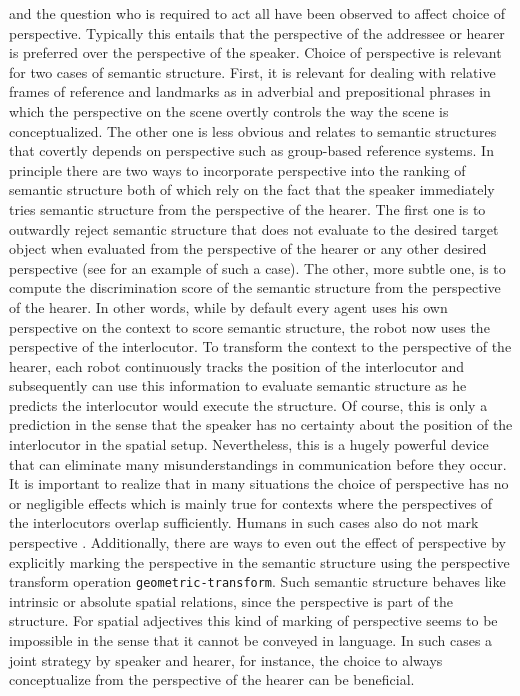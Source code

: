 \begin{description}
and the question who is required to act \citep{tversky2009perspective}
all have been observed to affect choice of perspective. Typically this
entails that the perspective of the addressee or hearer is preferred over
the perspective of the speaker. Choice of perspective is relevant for 
two cases of semantic structure. First, it is relevant for  
dealing with relative frames of reference and landmarks as in adverbial
and prepositional phrases in which the perspective on the scene 
overtly controls the way the scene is conceptualized. 
The other one is less obvious and relates to semantic structures that 
covertly depends on perspective such as 
group-based reference systems. In principle there are two ways 
to incorporate perspective into the ranking of semantic structure both of 
which rely on the fact that the speaker immediately tries semantic
structure from the perspective of the hearer. The first one is to outwardly
reject semantic structure that does not evaluate to the desired 
target object when evaluated from the perspective of the hearer or any
other desired perspective (see  
for an example of such a case). 
The other, more subtle one, is to compute the discrimination score
of the semantic structure from the perspective of the hearer. In other words,
while by default every agent uses his own perspective on the context
to score semantic structure, the robot now uses the perspective of the interlocutor.
To transform the context to the perspective of the hearer, each robot
continuously tracks the position of the interlocutor and subsequently
can use this information to evaluate semantic structure as he
predicts the interlocutor would execute the structure. Of course,
this is only a prediction in the sense that the speaker has
no certainty about the position of the interlocutor in the spatial
setup. Nevertheless, this is a hugely powerful device that
can eliminate many misunderstandings in communication 
before they occur. It is important to realize that in many situations
the choice of perspective has no or negligible effects
which is mainly true for contexts where 
the perspectives of the interlocutors overlap sufficiently.
Humans in such cases also do not mark perspective 
\citep{tenbrink2005dimensional}.
Additionally, there are ways to even out the effect
of perspective by explicitly marking the perspective in the semantic
structure using the perspective transform operation
{\footnotesize\tt geometric-transform}. Such semantic structure
behaves like intrinsic or absolute spatial relations, since
the perspective is part of the structure. For spatial
adjectives this kind of marking of perspective
seems to be impossible in the sense that it cannot be conveyed
in language. In such cases a joint strategy by speaker
and hearer, for instance, the choice to always conceptualize from
the perspective of the hearer can be beneficial.


\end{description}
